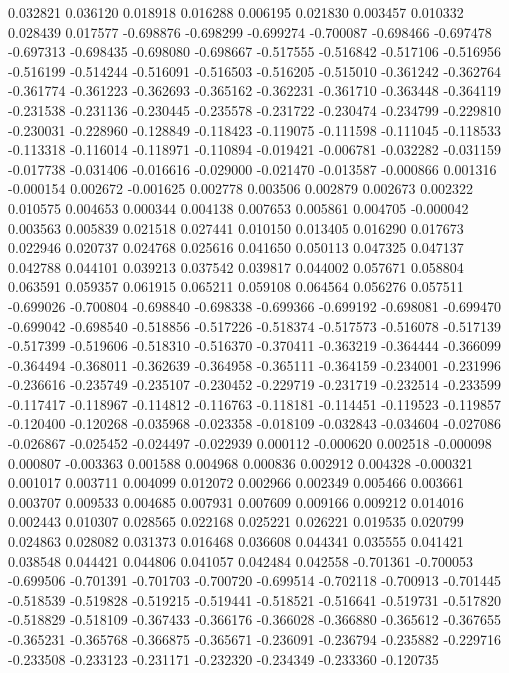 0.032821
0.036120
0.018918
0.016288
0.006195
0.021830
0.003457
0.010332
0.028439
0.017577
-0.698876
-0.698299
-0.699274
-0.700087
-0.698466
-0.697478
-0.697313
-0.698435
-0.698080
-0.698667
-0.517555
-0.516842
-0.517106
-0.516956
-0.516199
-0.514244
-0.516091
-0.516503
-0.516205
-0.515010
-0.361242
-0.362764
-0.361774
-0.361223
-0.362693
-0.365162
-0.362231
-0.361710
-0.363448
-0.364119
-0.231538
-0.231136
-0.230445
-0.235578
-0.231722
-0.230474
-0.234799
-0.229810
-0.230031
-0.228960
-0.128849
-0.118423
-0.119075
-0.111598
-0.111045
-0.118533
-0.113318
-0.116014
-0.118971
-0.110894
-0.019421
-0.006781
-0.032282
-0.031159
-0.017738
-0.031406
-0.016616
-0.029000
-0.021470
-0.013587
-0.000866
0.001316
-0.000154
0.002672
-0.001625
0.002778
0.003506
0.002879
0.002673
0.002322
0.010575
0.004653
0.000344
0.004138
0.007653
0.005861
0.004705
-0.000042
0.003563
0.005839
0.021518
0.027441
0.010150
0.013405
0.016290
0.017673
0.022946
0.020737
0.024768
0.025616
0.041650
0.050113
0.047325
0.047137
0.042788
0.044101
0.039213
0.037542
0.039817
0.044002
0.057671
0.058804
0.063591
0.059357
0.061915
0.065211
0.059108
0.064564
0.056276
0.057511
-0.699026
-0.700804
-0.698840
-0.698338
-0.699366
-0.699192
-0.698081
-0.699470
-0.699042
-0.698540
-0.518856
-0.517226
-0.518374
-0.517573
-0.516078
-0.517139
-0.517399
-0.519606
-0.518310
-0.516370
-0.370411
-0.363219
-0.364444
-0.366099
-0.364494
-0.368011
-0.362639
-0.364958
-0.365111
-0.364159
-0.234001
-0.231996
-0.236616
-0.235749
-0.235107
-0.230452
-0.229719
-0.231719
-0.232514
-0.233599
-0.117417
-0.118967
-0.114812
-0.116763
-0.118181
-0.114451
-0.119523
-0.119857
-0.120400
-0.120268
-0.035968
-0.023358
-0.018109
-0.032843
-0.034604
-0.027086
-0.026867
-0.025452
-0.024497
-0.022939
0.000112
-0.000620
0.002518
-0.000098
0.000807
-0.003363
0.001588
0.004968
0.000836
0.002912
0.004328
-0.000321
0.001017
0.003711
0.004099
0.012072
0.002966
0.002349
0.005466
0.003661
0.003707
0.009533
0.004685
0.007931
0.007609
0.009166
0.009212
0.014016
0.002443
0.010307
0.028565
0.022168
0.025221
0.026221
0.019535
0.020799
0.024863
0.028082
0.031373
0.016468
0.036608
0.044341
0.035555
0.041421
0.038548
0.044421
0.044806
0.041057
0.042484
0.042558
-0.701361
-0.700053
-0.699506
-0.701391
-0.701703
-0.700720
-0.699514
-0.702118
-0.700913
-0.701445
-0.518539
-0.519828
-0.519215
-0.519441
-0.518521
-0.516641
-0.519731
-0.517820
-0.518829
-0.518109
-0.367433
-0.366176
-0.366028
-0.366880
-0.365612
-0.367655
-0.365231
-0.365768
-0.366875
-0.365671
-0.236091
-0.236794
-0.235882
-0.229716
-0.233508
-0.233123
-0.231171
-0.232320
-0.234349
-0.233360
-0.120735
